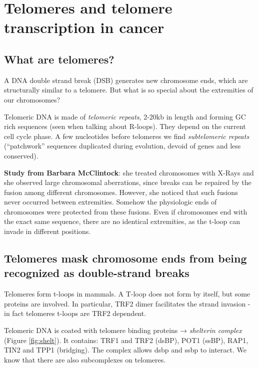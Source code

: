 \graphicspath{{chapters/_resources/}}

\chapter{Telomeres and telomere transcription in cancer}

\hypertarget{what-are-telomeres}{%
\section{What are telomeres?}\label{what-are-telomeres}}

A DNA double strand break (DSB) generates new chromosome ends, which are
structurally similar to a telomere. But what is so special about the
extremities of our chromosomes?

Telomeric DNA is made of \emph{telomeric repeats}, 2-20kb in length and
forming GC rich sequences (seen when talking about R-loops). They depend
on the current cell cycle phase. A few nucleotides before telomeres we
find \emph{subtelomeric repeats} (``patchwork'' sequences duplicated
during evolution, devoid of genes and less conserved).

\textbf{Study from Barbara McClintock}: she treated chromosomes with
X-Rays and she observed large chromosomal aberrations, since breaks can
be repaired by the fusion among different chromosomes. However, she
noticed that such fusions never occurred between extremities. Somehow
the physiologic ends of chromosomes were protected from these fusions.
Even if chromosomes end with the exact same sequence, there are no
identical extremities, as the t-loop can invade in different positions.

\hypertarget{telomeres-mask-chromosome-ends-from-being-recognized-as-double-strand-breaks}{%
\section{Telomeres mask chromosome ends from being recognized as double-strand breaks}\label{telomeres-mask-chromosome-ends-from-being-recognized-as-double-strand-breaks}}

Telomeres form t-loops in mammals. A
T-loop does not form by itself, but some proteins are involved. In
particular, TRF2 dimer facilitates the strand invasion - in fact
telomeres t-loops are TRF2 dependent.

Telomeric DNA is coated with telomere binding proteins → \emph{shelterin
complex} (Figure \ref{fig:shelt}). It contains: TRF1 and TRF2 (dsBP), POT1 (ssBP), RAP1, TIN2 and
TPP1 (bridging). The complex allows dsbp and ssbp to interact. We know
that there are also subcomplexes on telomeres.

